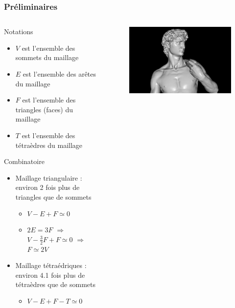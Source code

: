 \documentclass[9pt]{beamer}
\begin{document}
\begin{frame}
\small
\frametitle{Préliminaires}

\begin{columns}[c]
    \begin{column}[c]{.6\textwidth}
 		\begin{block}{Notations}
\begin{itemize}
\item $V$ est l'ensemble des sommets du maillage
\item $E$ est l'ensemble des arêtes du maillage
\item $F$ est l'ensemble des triangles (faces) du maillage
\item $T$ est l'ensemble des tétraèdres du maillage
\end{itemize}
\end{block}
\begin{block}{Combinatoire}
\begin{itemize}
\item Maillage triangulaire : environ 2 fois plus de triangles que de sommets
\begin{itemize}
\item $V-E+F\simeq 0$
\item $2E=3F$ $\Rightarrow$ $V-\frac{3}{2}F+F\simeq 0$ $\Rightarrow$ $F\simeq 2V$
\end{itemize}
\item Maillage tétraédriques : environ 4.1 fois plus de tétraèdres que de sommets
\begin{itemize}
\item $V-E+F-T\simeq 0$
\end{itemize}
\end{itemize}
\end{block}
    \end{column}%
    \begin{column}[c]{.37\textwidth}
    \vspace{-15.5pt}
    \begin{figure}
    \includegraphics[scale=0.09]{Images/michelangelo}

\end{figure}
\end{column}
\end{columns}
\end{frame}
\end{document}
